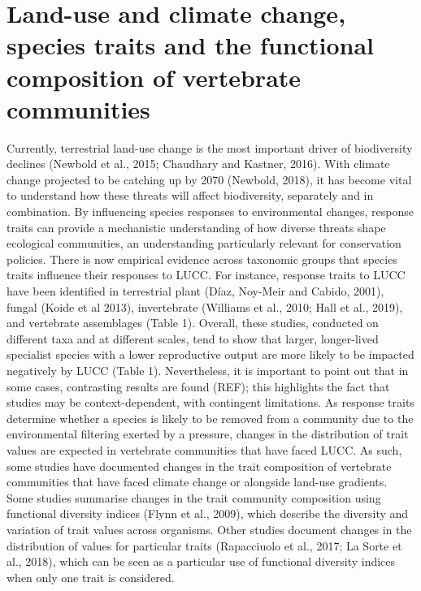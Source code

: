 
\section{Land-use and climate change, species traits and the functional composition of vertebrate communities}
Currently, terrestrial land-use change is the most important driver of biodiversity declines (Newbold et al., 2015; Chaudhary and Kastner, 2016). With climate change projected to be catching up by 2070 (Newbold, 2018), it has become vital to understand how these threats will affect biodiversity, separately and in combination. By influencing species responses to environmental changes, response traits can provide a mechanistic understanding of how diverse threats shape ecological communities, an understanding particularly relevant for conservation policies. 
There is now empirical evidence across taxonomic groups that species traits influence their responses to LUCC. For instance, response traits to LUCC have been identified in terrestrial plant (Díaz, Noy-Meir and Cabido, 2001), fungal (Koide et al 2013), invertebrate (Williams et al., 2010; Hall et al., 2019), and vertebrate assemblages (Table 1). Overall, these studies, conducted on different taxa and at different scales, tend to show that larger, longer-lived specialist species with a lower reproductive output are more likely to be impacted negatively by LUCC (Table 1). Nevertheless, it is important to point out that in some cases, contrasting results are found (REF); this highlights the fact that studies may be context-dependent, with contingent limitations. 
As response traits determine whether a species is likely to be removed from a community due to the environmental filtering exerted by a pressure, changes in the distribution of trait values are expected in vertebrate communities that have faced LUCC. As such, some studies have documented changes in the trait composition of vertebrate communities that have faced climate change or alongside land-use gradients. Some studies summarise changes in the trait community composition using functional diversity indices (Flynn et al., 2009), which describe the diversity and variation of trait values across organisms. Other studies document changes in the distribution of values for particular traits (Rapacciuolo et al., 2017; La Sorte et al., 2018), which can be seen as a particular use of functional diversity indices when only one trait is considered. 
